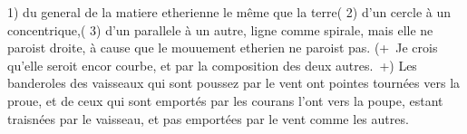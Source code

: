 1) du general de la matiere etherienne le m\^{e}me que la terre\protect{}\phantom(%
2) d'un cercle \`{a} un concentrique,\phantom(%
3) d'un parallele \`{a} un autre, ligne comme spirale, mais elle ne paroist droite, \`{a} cause que le mouuement etherien ne paroist pas.%
%
%
(+~Je crois qu'elle seroit encor courbe, et par la composition des deux autres.~+)
%
Les banderoles%
des vaisseaux\protect{} qui sont poussez par le vent\protect{} ont
pointes tourn\'{e}es vers la proue, et
de ceux qui sont emport\'{e}s par les courans l'ont vers
la poupe, estant traisn\'{e}es par le vaisseau\protect{}, et
pas emport\'{e}es par le vent\protect{} comme les autres.
%
%
\pend%
\count{}
\count{}
\count{}
